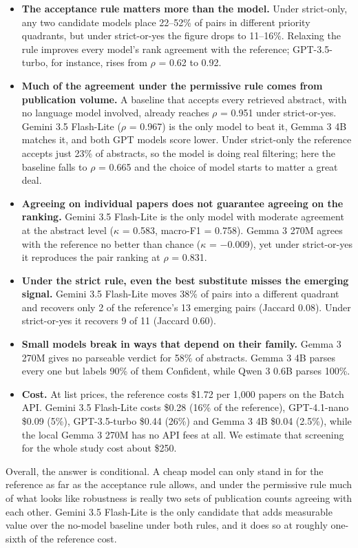 \documentclass[11pt,a4paper]{article}
\begin{document}
\begin{itemize}
\item \textbf{The acceptance rule matters more than the model.} Under strict-only, any two candidate models place 22--52\% of pairs in different priority quadrants, but under strict-or-yes the figure drops to 11--16\%. Relaxing the rule improves every model's rank agreement with the reference; GPT-3.5-turbo, for instance, rises from $\rho$ = 0.62 to 0.92.
\item \textbf{Much of the agreement under the permissive rule comes from publication volume.} A baseline that accepts every retrieved abstract, with no language model involved, already reaches $\rho$ = 0.951 under strict-or-yes. Gemini 3.5 Flash-Lite ($\rho$ = 0.967) is the only model to beat it, Gemma 3 4B matches it, and both GPT models score lower. Under strict-only the reference accepts just 23\% of abstracts, so the model is doing real filtering; here the baseline falls to $\rho$ = 0.665 and the choice of model starts to matter a great deal.
\item \textbf{Agreeing on individual papers does not guarantee agreeing on the ranking.} Gemini 3.5 Flash-Lite is the only model with moderate agreement at the abstract level ($\kappa$ = 0.583, macro-F1 = 0.758). Gemma 3 270M agrees with the reference no better than chance ($\kappa$ = $-$0.009), yet under strict-or-yes it reproduces the pair ranking at $\rho$ = 0.831.
\item \textbf{Under the strict rule, even the best substitute misses the emerging signal.} Gemini 3.5 Flash-Lite moves 38\% of pairs into a different quadrant and recovers only 2 of the reference's 13 emerging pairs (Jaccard 0.08). Under strict-or-yes it recovers 9 of 11 (Jaccard 0.60).
\item \textbf{Small models break in ways that depend on their family.} Gemma 3 270M gives no parseable verdict for 58\% of abstracts. Gemma 3 4B parses every one but labels 90\% of them Confident, while Qwen 3 0.6B parses 100\%.
\item \textbf{Cost.} At list prices, the reference costs \$1.72 per 1,000 papers on the Batch API. Gemini 3.5 Flash-Lite costs \$0.28 (16\% of the reference), GPT-4.1-nano \$0.09 (5\%), GPT-3.5-turbo \$0.44 (26\%) and Gemma 3 4B \$0.04 (2.5\%), while the local Gemma 3 270M has no API fees at all. We estimate that screening for the whole study cost about \$250.
\end{itemize}
Overall, the answer is conditional. A cheap model can only stand in for the reference as far as the acceptance rule allows, and under the permissive rule much of what looks like robustness is really two sets of publication counts agreeing with each other. Gemini 3.5 Flash-Lite is the only candidate that adds measurable value over the no-model baseline under both rules, and it does so at roughly one-sixth of the reference cost.
\end{document}
